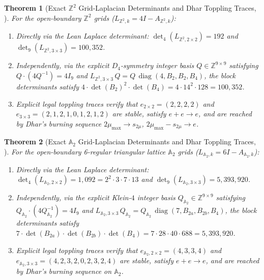 \documentclass[11pt,reqno]{amsart}
\theoremstyle{plain}
\newtheorem{theorem}{Theorem}[section]
\theoremstyle{definition}
\newcommand{\ZZ}{\mathbb{Z}}
\newcommand{\code}[1]{\texttt{\detokenize{#1}}}
\begin{document}
\begin{theorem}[Exact $\ZZ^2$ Grid-Laplacian Determinants and Dhar Toppling Traces, \code{T2b}]
\label{thm:t2b}
For the open-boundary $\ZZ^2$ grids ($L_{\ZZ^2,k} = 4I - A_{\ZZ^2,k}$):
\begin{enumerate}[leftmargin=1.8em, itemsep=1pt]
  \item Directly via the Lean Laplace determinant: $\det_4(L_{\ZZ^2, 2\times 2}) = 192$ and $\det_9(L_{\ZZ^2, 3\times 3}) = 100{,}352$.
  \item Independently, via the explicit $D_4$-symmetry integer basis $Q \in \ZZ^{9\times 9}$ satisfying $Q \cdot (4 Q^{-1}) = 4 I_9$ and $L_{\ZZ^2, 3\times 3}\, Q = Q\,\operatorname{diag}(4, B_2, B_2, B_4)$, the block determinants satisfy $4 \cdot \det(B_2)^2 \cdot \det(B_4) = 4 \cdot 14^2 \cdot 128 = 100{,}352$.
  \item Explicit legal toppling traces verify that $e_{2\times 2} = (2,2,2,2)$ and $e_{3\times 3} = (2,1,2,1,0,1,2,1,2)$ are stable, satisfy $e + e \to e$, and are reached by Dhar's burning sequence $2\mu_{\max} \to s_{2\mu}$, $2\mu_{\max} - s_{2\mu} \to e$.
\end{enumerate}
\end{theorem}

\begin{theorem}[Exact $\mathbb{A}_2$ Grid-Laplacian Determinants and Dhar Toppling Traces, \code{T2f}]
\label{thm:t2f}
For the open-boundary 6-regular triangular lattice $\mathbb{A}_2$ grids ($L_{\mathbb{A}_2,k} = 6I - A_{\mathbb{A}_2,k}$):
\begin{enumerate}[leftmargin=1.8em, itemsep=1pt]
  \item Directly via the Lean Laplace determinant: $\det_4(L_{\mathbb{A}_2, 2\times 2}) = 1{,}092 = 2^2 \cdot 3 \cdot 7 \cdot 13$ and $\det_9(L_{\mathbb{A}_2, 3\times 3}) = 5{,}393{,}920$.
  \item Independently, via the explicit Klein-$4$ integer basis $Q_{\mathbb{A}_2} \in \ZZ^{9\times 9}$ satisfying $Q_{\mathbb{A}_2}\cdot(4 Q_{\mathbb{A}_2}^{-1}) = 4 I_9$ and $L_{\mathbb{A}_2, 3\times 3}\,Q_{\mathbb{A}_2} = Q_{\mathbb{A}_2}\,\operatorname{diag}(7, B_{2a}, B_{2b}, B_4)$, the block determinants satisfy $7 \cdot \det(B_{2a}) \cdot \det(B_{2b}) \cdot \det(B_4) = 7 \cdot 28 \cdot 40 \cdot 688 = 5{,}393{,}920$.
  \item Explicit legal toppling traces verify that $e_{\mathbb{A}_2, 2\times 2} = (4,3,3,4)$ and $e_{\mathbb{A}_2, 3\times 3} = (4,2,3,2,0,2,3,2,4)$ are stable, satisfy $e + e \to e$, and are reached by Dhar's burning sequence on $\mathbb{A}_2$.
\end{enumerate}
\end{theorem}
\end{document}
